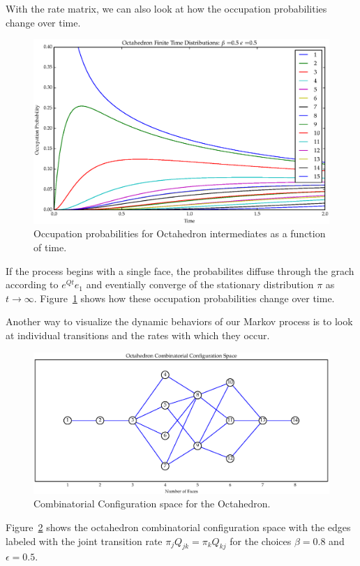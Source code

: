 With the rate matrix, we can also look at how the occupation probabilities change over time. 
\begin{figure}[ht]
\label{fig:OctaFinDist}
\centering
  \includegraphics[scale=0.6]{images/octahedron_finite_dist.eps}
\caption{Occupation probabilities for Octahedron intermediates as a function of time.}
\end{figure}
If the process begins with a single face, the probabilites diffuse through the grach according to $e^{Qt}e_1$ and eventially converge of the stationary distribution $\pi$ as $t \to \infty$. Figure~\ref{fig:OctaFinDist} shows how these occupation probabilities change over time.

Another way to visualize the dynamic behaviors of our Markov process is to look at individual transitions and the rates with which they occur.
\begin{figure}[ht]
\label{fig:OctaCCS}
\centering
  \includegraphics[scale=0.6]{images/octahedron_ccs.eps}
\caption{Combinatorial Configuration space for the Octahedron.}
\end{figure}
Figure~\ref{fig:OctaCCS} shows the octahedron combinatorial configuration space with the edges labeled with the joint transition rate $\pi_j Q_{jk} = \pi_k Q_{kj}$ for the choices $\beta = 0.8$ and $\epsilon = 0.5$.

